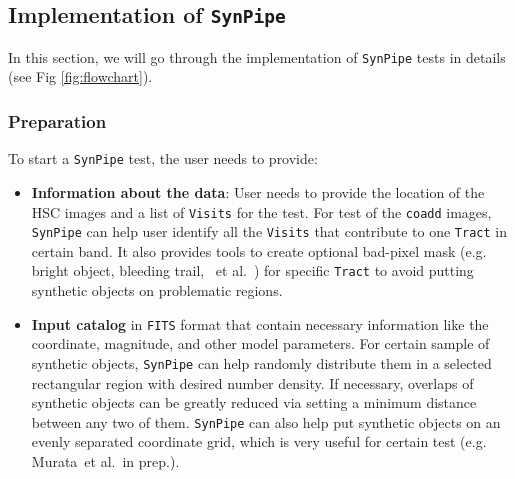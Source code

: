 \documentclass[useamsfonts]{pasj01}
\def\etal{{\ et al.~}}
\def\synpipe{\texttt{SynPipe}}
\def\tract{\texttt{Tract}}
\def\visits{\texttt{Visits}}
\begin{document}
\subsection{Implementation of \synpipe{}} 
    \label{ssec:flowchart} 
    
    In this section, we will go through the implementation of \synpipe{} tests in 
    details (see Fig \ref{fig:flowchart}). 

\subsubsection{Preparation}
    \label{sssec:prep}
    
    To start a \synpipe{} test, the user needs to provide: 
    
    \begin{itemize}
    
        \item \textbf{Information about the data}: User needs to provide the 
            location of the HSC images and a list of \visits{} for the
            test.  
            For test of the \texttt{coadd} images, \synpipe{} can help user identify 
            all the \visits{} that contribute to one \tract{} in certain
            band. 
            It also provides tools to create optional bad-pixel mask (e.g. bright 
            object, bleeding trail, \etal) for specific \tract{} to avoid 
            putting synthetic objects on problematic regions. 
        
        \item \textbf{Input catalog} in \texttt{FITS} format that contain necessary 
            information like the coordinate, magnitude, and other model parameters. 
            For certain sample of synthetic objects, \synpipe{} can help randomly 
            distribute them in a selected rectangular region with desired number 
            density. 
            If necessary, overlaps of synthetic objects can be greatly reduced 
            via setting a minimum distance between any two of them. 
            \synpipe{} can also help put synthetic objects on an evenly separated 
            coordinate grid, which is very useful for certain test 
            (e.g. Murata\etal in prep.). 
            
    \end{itemize}
\end{document}

